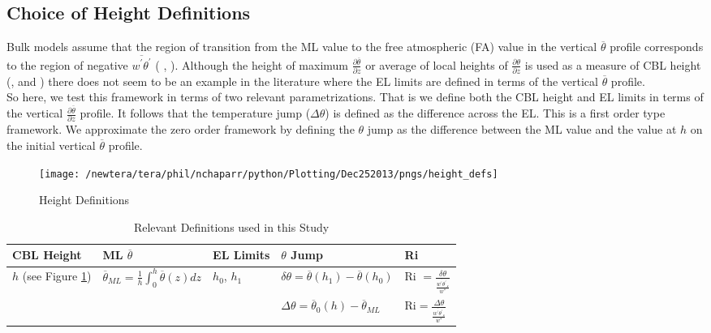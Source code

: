 \subsection{Choice of Height Definitions}

Bulk models assume that the region of transition from the \acs{ML} value to the free atmospheric (\acs{FA}) value in the vertical $\overline{\theta}$ profile corresponds to the region of negative $\overline{w^{'}\theta^{'}}$ (\citeauthor{Deardorff79} \cite{Deardorff79}, \citeauthor{FedConzMir04} \cite{FedConzMir04}).  Although the height of maximum $\frac{\partial \overline{\theta}}{\partial z}$ or average of local heights of $\frac{\partial \theta}{\partial z}$ is used as a measure of \acs{CBL} height (\citeauthor{SullMoengStev}, \cite{SullMoengStev} and \citeauthor{GarciaMellado} \cite{GarciaMellado}) there does not seem to be an example in the literature where the \acs{EL} limits are defined in terms of the vertical $\overline{\theta}$ profile.\\

So here, we test this framework in terms of two relevant parametrizations.  That is we define both the \acs{CBL} height and \acs{EL} limits in terms of the vertical $\frac{\partial \overline{\theta}}{\partial z}$ profile. It follows that the temperature jump ($\Delta \theta$) is defined as the difference across the \acs{EL}.  This is a first order type framework.  We approximate the zero order framework by defining the $\theta$ jump as the difference between the \acs{ML} value and the value at $h$ on the initial vertical $\overline{\theta}$ profile.
       
\begin{figure}[htbp]
    \centering
    \texttt{[image: /newtera/tera/phil/nchaparr/python/Plotting/Dec252013/pngs/height\_defs]}
    \caption{Height Definitions}
    \label{fig:hdefs}   %
\end{figure}

\begin{table}[htbp]
    \begin{center}
    \begin{tabular}{| p{2cm}| p{2cm} | p{2cm} | p{2cm}| p{2cm}| }
    \hline
      \acs{CBL} Height & \acs{ML} $\overline{\theta}$ & \acs{EL} Limits & $\theta$ Jump & \acs{Ri} \\ \hline 
       $h$ (see Figure \ref{fig:hdefs})& $\overline{\theta}_{ML} = \frac{1}{h}\int^{h}_{0}\overline{\theta}(z)dz$ & $h_{0}$, $h_{1}$ & $\delta \theta=\overline{\theta}(h_{1})-\overline{\theta}(h_{0})$ & \acs{Ri} $=\frac{\delta \theta}{\frac{\overline{w^{'}\theta^{'}}_{s}}{w^{*}}}$  \\ \hline 
       & & &$\Delta \theta = \overline{\theta}_{0}(h)- \overline{\theta}_{ML}$ & \acs{Ri}$=\frac{\Delta \theta}{\frac{\overline{w^{'}\theta^{'}}_{s}}{w^{*}}}$ \\ \hline
      \end{tabular}
\caption{Relevant Definitions used in this Study}
\label{table:reldefs}   
\end{center}    
\end{table}

